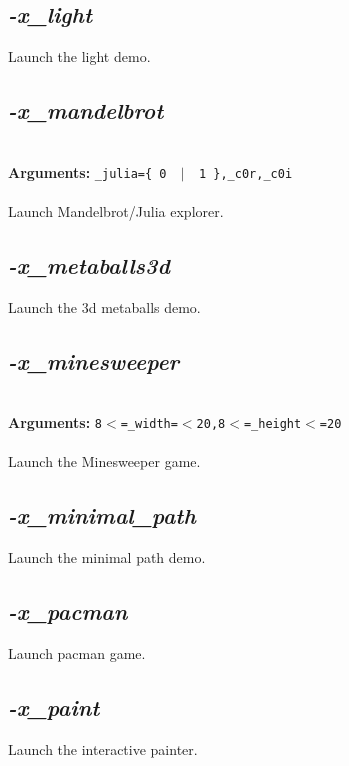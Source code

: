 \documentclass[a4paper,11pt,twoside]{book}
\begin{document}
\subsection{\emph{-x\_light} }\vspace*{-0.5em}
Launch the light demo.


\subsection{\emph{-x\_mandelbrot} }\vspace*{-0.5em}
~\\\textbf{Arguments: } 
{\small \texttt{\_julia=\{ 0 ~$|$~ 1 \},\_c0r,\_c0i}}\\~\\
Launch Mandelbrot/Julia explorer.


\subsection{\emph{-x\_metaballs3d} }\vspace*{-0.5em}
Launch the 3d metaballs demo.


\subsection{\emph{-x\_minesweeper} }\vspace*{-0.5em}
~\\\textbf{Arguments: } 
{\small \texttt{8$<$=\_width=$<$20,8$<$=\_height$<$=20}}\\~\\
Launch the Minesweeper game.


\subsection{\emph{-x\_minimal\_path} }\vspace*{-0.5em}
Launch the minimal path demo.


\subsection{\emph{-x\_pacman} }\vspace*{-0.5em}
Launch pacman game.


\subsection{\emph{-x\_paint} }\vspace*{-0.5em}
Launch the interactive painter.
\end{document}
